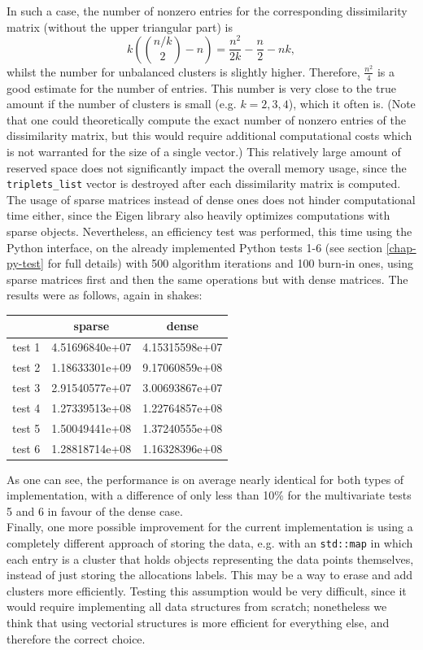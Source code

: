 In such a case, the number of nonzero entries for the corresponding dissimilarity matrix (without the upper triangular part) is
$$ k \left(\binom{n/k}{2} - n\right) = \frac{n^2}{2k} -\frac{n}{2} - nk,$$
whilst the number for unbalanced clusters is slightly higher.
Therefore, $\frac{n^2}{4}$ is a good estimate for the number of entries.
This number is very close to the true amount if the number of clusters is small (e.g. $k=2,3,4$), which it often is. (Note that one could theoretically compute the exact number of nonzero entries of the dissimilarity matrix, but this would require additional computational costs which is not warranted for the size of a single vector.)
This relatively large amount of reserved space does not significantly impact the overall memory usage, since the \verb|triplets_list| vector is destroyed after each dissimilarity matrix is computed. \\
The usage of sparse matrices instead of dense ones does not hinder computational time either, since the Eigen library also heavily optimizes computations with sparse objects.
Nevertheless, an efficiency test was performed, this time using the Python interface, on the already implemented Python tests 1-6 (see section \ref{chap-py-test} for full details) with 500 algorithm iterations and 100 burn-in ones, using sparse matrices first and then the same operations but with dense matrices.
The results were as follows, again in shakes:
\begin{center}
	\begin{tabular}{c|c|c}
       &      sparse    &      dense     \\ \hline
test 1 & 4.51696840e+07 & 4.15315598e+07 \\
test 2 & 1.18633301e+09 & 9.17060859e+08 \\
test 3 & 2.91540577e+07 & 3.00693867e+07 \\
test 4 & 1.27339513e+08 & 1.22764857e+08 \\
test 5 & 1.50049441e+08 & 1.37240555e+08 \\
test 6 & 1.28818714e+08 & 1.16328396e+08
	\end{tabular}
\end{center}
As one can see, the performance is on average nearly identical for both types of implementation, with a difference of only less than 10\% for the multivariate tests 5 and 6 in favour of the dense case. \\[8pt]
Finally, one more possible improvement for the current implementation is using a completely different approach of storing the data, e.g. with an \verb|std::map| in which each entry is a cluster that holds objects representing the data points themselves, instead of just storing the allocations labels.
This may be a way to erase and add clusters more efficiently.
Testing this assumption would be very difficult, since it would require implementing all data structures from scratch; nonetheless we think that using vectorial structures is more efficient for everything else, and therefore the correct choice.


